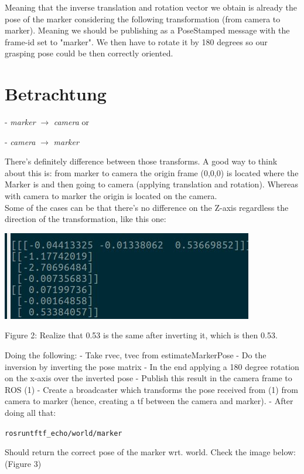 \documentclass{article}
\begin{document}
Meaning that the inverse translation and rotation vector we obtain is already the pose of the marker considering the following transformation (from camera to marker). Meaning we should be publishing as a PoseStamped message with the frame-id set to "marker". We then have to rotate it by 180 degrees so our grasping pose could be then correctly oriented.

\section{Betrachtung}

- \textit{marker} $\xrightarrow{}$ \textit{camera} or

- \textit{camera} $\xrightarrow{}$ \textit{marker} 

There’s definitely difference between those transforms. A good way to think about this is: from marker to camera the origin frame (0,0,0) is located where the Marker is and then going to camera (applying translation and rotation). Whereas with camera to marker the origin is located on the camera. 
\\
Some of the cases can be that there’s no difference on the Z-axis regardless the direction of the transformation, like this one:
\begin{center}
  \includegraphics[scale=0.5]{pictures/pic2.jpeg}
  
  Figure 2: Realize that 0.53 is the same after inverting it, which is then 0.53.
\end{center}
Doing the following:
- Take rvec, tvec from estimateMarkerPose
- Do the inversion by inverting the pose matrix
- In the end applying a 180 degree rotation on the x-axis over the inverted pose
- Publish this result in the camera frame to ROS (1)
- Create a broadcaster which transforms the pose received from (1) from camera to marker (hence, creating a tf between the camera and marker).
- After doing all that:
\begin{alltt}
    rosrun tf tf_echo /world /marker 
\end{alltt}
Should return the correct pose of the marker wrt. world. Check the image below: (Figure 3)
\end{document}
